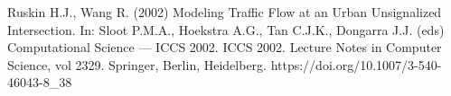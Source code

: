 \documentclass[12pt]{article}
\begin{document}
    \begin{thebibliography}{99}
         Ruskin H.J., Wang R. (2002) Modeling Traffic Flow at an Urban Unsignalized Intersection. In: Sloot P.M.A., Hoekstra A.G., Tan C.J.K., Dongarra J.J. (eds) Computational Science — ICCS 2002. ICCS 2002. Lecture Notes in Computer Science, vol 2329. Springer, Berlin, Heidelberg. https://doi.org/10.1007/3-540-46043-8\_38
    \end{thebibliography}
    
\end{document}
